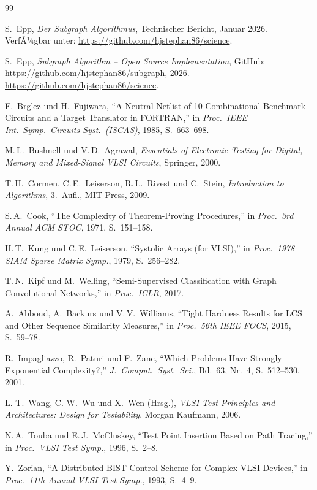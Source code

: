 ﻿\documentclass[a4paper,12pt]{article}
\theoremstyle{definition}
\begin{document}
\begin{thebibliography}{99}

S.~Epp, \textit{Der Subgraph Algorithmus}, Technischer Bericht, Januar 2026.
VerfÃ¼gbar unter: \url{https://github.com/hjstephan86/science}.

S.~Epp, \textit{Subgraph Algorithm -- Open Source Implementation},
GitHub: \url{https://github.com/hjstephan86/subgraph}, 2026.
\url{https://github.com/hjstephan86/science}.

F.~Brglez und H.~Fujiwara, ``A Neutral Netlist of 10 Combinational
Benchmark Circuits and a Target Translator in FORTRAN,'' in
\textit{Proc.\ IEEE Int.\ Symp.\ Circuits Syst.\ (ISCAS)}, 1985,
S.~663--698.

M.\,L.~Bushnell und V.\,D.~Agrawal,
\textit{Essentials of Electronic Testing for Digital, Memory and
Mixed-Signal VLSI Circuits}, Springer, 2000.

T.\,H.~Cormen, C.\,E.~Leiserson, R.\,L.~Rivest und C.~Stein,
\textit{Introduction to Algorithms}, 3.~Aufl., MIT Press, 2009.

S.\,A.~Cook, ``The Complexity of Theorem-Proving Procedures,'' in
\textit{Proc.\ 3rd Annual ACM STOC}, 1971, S.~151--158.

H.\,T.~Kung und C.\,E.~Leiserson, ``Systolic Arrays (for VLSI),''
in \textit{Proc.\ 1978 SIAM Sparse Matrix Symp.}, 1979, S.~256--282.

T.\,N.~Kipf und M.~Welling, ``Semi-Supervised Classification with
Graph Convolutional Networks,'' in \textit{Proc.\ ICLR}, 2017.

A.~Abboud, A.~Backurs und V.\,V.~Williams, ``Tight Hardness Results
for LCS and Other Sequence Similarity Measures,'' in
\textit{Proc.\ 56th IEEE FOCS}, 2015, S.~59--78.

R.~Impagliazzo, R.~Paturi und F.~Zane, ``Which Problems Have Strongly
Exponential Complexity?,'' \textit{J.~Comput.\ Syst.\ Sci.},
Bd.~63, Nr.~4, S.~512--530, 2001.

L.-T.~Wang, C.-W.~Wu und X.~Wen (Hrsg.),
\textit{VLSI Test Principles and Architectures: Design for Testability},
Morgan Kaufmann, 2006.

N.\,A.~Touba und E.\,J.~McCluskey, ``Test Point Insertion Based on
Path Tracing,'' in \textit{Proc.\ VLSI Test Symp.}, 1996, S.~2--8.

Y.~Zorian, ``A Distributed BIST Control Scheme for Complex VLSI
Devices,'' in \textit{Proc.\ 11th Annual VLSI Test Symp.}, 1993,
S.~4--9.

\end{thebibliography}
\end{document}
